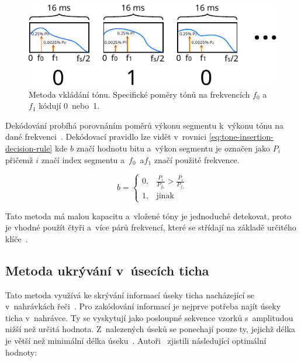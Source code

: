 \begin{figure}[hbt]
    \centering
    \includegraphics[width=\textwidth]{obrazky/tone-insertion-diagram.pdf}
    \caption{Metoda vkládání tónu. Specifické poměry tónů na frekvencích $f_0$
    a~$f_1$ kódují 0~nebo~1.}
    \label{pic:tone-insertion}
\end{figure}

Dekódování probíhá porovnáním poměrů výkonu segmentu k~výkonu tónu na dané
frekvenci~\cite{Djebbar2012}. Dekódovací pravidlo lze vidět v~rovnici
\ref{eq:tone-insertion-decision-rule} kde $b$ značí hodnotu bitu a~výkon
segmentu je označen jako $P_i$ přičemž $i$ značí index segmentu a~$f_0$~a$f_1$
značí použité frekvence.

\begin{equation}
    \label{eq:tone-insertion-decision-rule}
    b = \left\{
        \begin{array}{rl}
            0, & \frac{P_i}{P_{f_0}} > \frac{P_i}{P_{f_1}} \\
            1, & \mathrm{jinak}
        \end{array}
    \right.
\end{equation}

\noindent Tato metoda má malou kapacitu a~vložené tóny je jednoduché detekovat,
proto je vhodné použít čtyři a~více párů frekvencí, které se střídají na
základě určitého klíče~\cite{Djebbar2012}.

\subsection*{Metoda ukrývání v~úsecích ticha}
\label{sub:hiding-in-silence-intervals}

Tato metoda využívá ke skrývání informací úseky ticha nacházející se
v~nahrávkách řeči~\cite{Djebbar2012}. Pro zakódování informací je nejprve
potřeba najít úseky ticha v~nahrávce. Ty se vyskytují jako posloupné sekvence
vzorků s~amplitudou nižší než určitá hodnota. Z~nalezených úseků se ponechají
pouze ty, jejichž délka je větší než minimální délka úseku~\cite{Shahreza2008}.
Autoři~\cite{Shahreza2008} zjistili následující optimální hodnoty:

